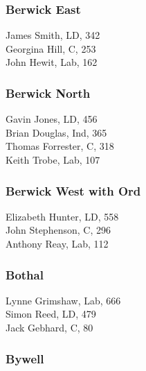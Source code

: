 \documentclass[a4paper,openany,10pt]{book}
\begin{document}
\subsubsection*{Berwick East}



James Smith, LD, 342\\
Georgina Hill, C, 253\\
John Hewit, Lab, 162\\


\subsubsection*{Berwick North}



Gavin Jones, LD, 456\\
Brian Douglas, Ind, 365\\
Thomas Forrester, C, 318\\
Keith Trobe, Lab, 107\\


\subsubsection*{Berwick West with Ord}



Elizabeth Hunter, LD, 558\\
John Stephenson, C, 296\\
Anthony Reay, Lab, 112\\


\subsubsection*{Bothal}



Lynne Grimshaw, Lab, 666\\
Simon Reed, LD, 479\\
Jack Gebhard, C, 80\\


\subsubsection*{Bywell}

\end{document}
